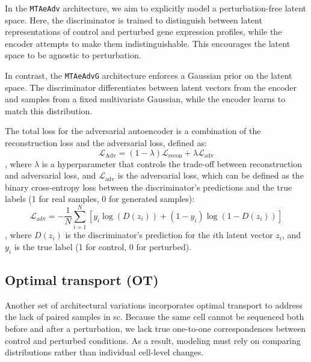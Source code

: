 \documentclass[12pt, a4paper]{article}
\begin{document}
In the \verb|MTAeAdv| architecture, we aim to explicitly model a perturbation-free latent space. Here, the discriminator is trained to distinguish between latent representations of control and perturbed gene expression profiles, while the encoder attempts to make them indistinguishable. This encourages the latent space to be agnostic to perturbation.

In contrast, the \verb|MTAeAdvG| architecture enforces a Gaussian prior on the latent space. The discriminator differentiates between latent vectors from the encoder and samples from a fixed multivariate Gaussian, while the encoder learns to match this distribution.

The total loss for the adversarial autoencoder is a combination of the reconstruction loss and the adversarial loss, defined as:
\[\mathcal{L}_{\text{Adv}} = (1 - \lambda) \mathcal{L}_{\text{recon}} +  \lambda \mathcal{L}_{\text{adv}}\]
, where $\lambda$ is a hyperparameter that controls the trade-off between reconstruction and adversarial loss, and $\mathcal{L}_{\text{adv}}$ is the adversarial loss, which can be defined as the binary cross-entropy loss between the discriminator's predictions and the true labels (1 for real samples, 0 for generated samples):
\[\mathcal{L}_{\text{adv}} = -\frac{1}{N} \sum_{i=1}^{N} \left[ y_i \log(D(z_i)) + (1 - y_i) \log(1 - D(z_i)) \right]\]
, where $D(z_i)$ is the discriminator's prediction for the $i$th latent vector $z_i$, and $y_i$ is the true label (1 for control, 0 for perturbed).


\subsection{Optimal transport (OT)}

Another set of architectural variations incorporates optimal transport to address the lack of paired samples in \gls{sc}. Because the same cell cannot be sequenced both before and after a perturbation, we lack true one-to-one correspondences between control and perturbed conditions. As a result, modeling must rely on comparing distributions rather than individual cell-level changes.
\end{document}
